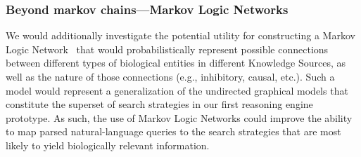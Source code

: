 \documentclass[11pt,notitlepage]{article}
\begin{document}
\subsubsection{Beyond markov chains---Markov Logic Networks}
We would additionally investigate the potential utility for constructing a
Markov Logic Network~\cite{Domingos:2012wi,domingos20071} that would
probabilistically represent possible connections between different types of
biological entities in different Knowledge Sources, as well as the nature of
those connections (e.g., inhibitory, causal, etc.). Such a model would represent
a generalization of the undirected graphical models that constitute the superset
of search strategies in our first reasoning engine prototype. As such, the use
of Markov Logic Networks could improve the ability to map parsed
natural-language queries to the search strategies that are most likely to yield
biologically relevant information.

\end{document}
